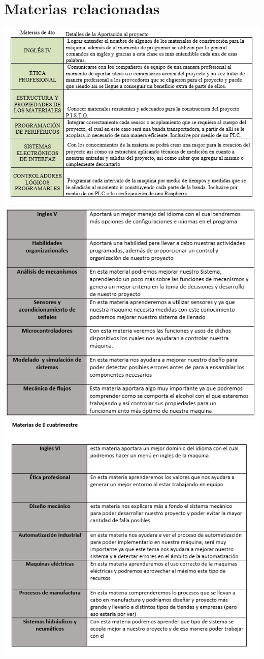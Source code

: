 \documentclass[12pt,a4paper]{report}
\begin{document}
\section{Materias relacionadas}
\includegraphics[width=16cm]{materias 2.png}  
\includegraphics[width=16cm]{Materias.png}
\newpage
\includegraphics[width=16cm]{Materias1.png} 
\end{document}
